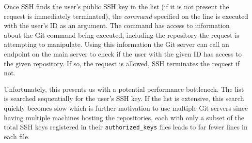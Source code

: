 Once SSH finds the user's public SSH key in the list (if it is not present the request is immediately terminated), the \emph{command} specified on the line is executed with the user's ID as an argument. The command has access to information about the Git command being executed, including the repository the request is attempting to manipulate. Using this information the Git server can call an endpoint on the main server to check if the user with the given ID has access to the given repository. If so, the request is allowed, SSH terminates the request if not.

Unfortunately, this presents us with a potential performance bottleneck. The list is searched sequentially for the user's SSH key. If the list is extensive, this search quickly becomes slow which is further motivation to use multiple Git servers since having multiple machines hosting the repositories, each with only a subset of the total SSH keys registered in their \texttt{authorized\_keys} files leads to far fewer lines in each file. 